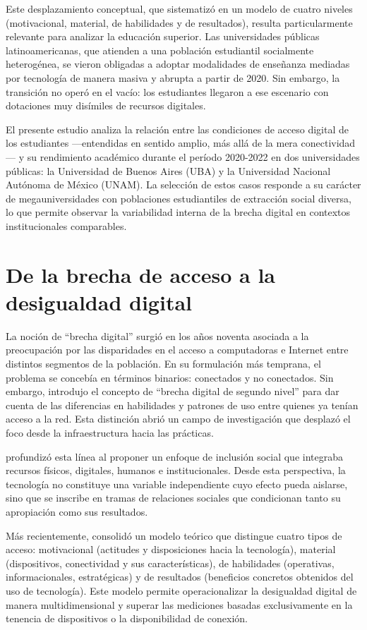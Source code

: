Este desplazamiento conceptual, que \autocite{2563-VANDIJK2020} sistematizó en un modelo de cuatro niveles (motivacional, material, de habilidades y de resultados), resulta particularmente relevante para analizar la educación superior. Las universidades públicas latinoamericanas, que atienden a una población estudiantil socialmente heterogénea, se vieron obligadas a adoptar modalidades de enseñanza mediadas por tecnología de manera masiva y abrupta a partir de 2020. Sin embargo, la transición no operó en el vacío: los estudiantes llegaron a ese escenario con dotaciones muy disímiles de recursos digitales.

El presente estudio analiza la relación entre las condiciones de acceso digital de los estudiantes —entendidas en sentido amplio, más allá de la mera conectividad— y su rendimiento académico durante el período 2020-2022 en dos universidades públicas: la Universidad de Buenos Aires (UBA) y la Universidad Nacional Autónoma de México (UNAM). La selección de estos casos responde a su carácter de megauniversidades con poblaciones estudiantiles de extracción social diversa, lo que permite observar la variabilidad interna de la brecha digital en contextos institucionales comparables.


\section{De la brecha de acceso a la desigualdad digital}
La noción de “brecha digital” surgió en los años noventa asociada a la preocupación por las disparidades en el acceso a computadoras e Internet entre distintos segmentos de la población. En su formulación más temprana, el problema se concebía en términos binarios: conectados y no conectados. Sin embargo, \autocite{2565-HARGITTAI2002} introdujo el concepto de “brecha digital de segundo nivel” para dar cuenta de las diferencias en habilidades y patrones de uso entre quienes ya tenían acceso a la red. Esta distinción abrió un campo de investigación que desplazó el foco desde la infraestructura hacia las prácticas.

\autocite{2562-WARSCHAUER2004} profundizó esta línea al proponer un enfoque de inclusión social que integraba recursos físicos, digitales, humanos e institucionales. Desde esta perspectiva, la tecnología no constituye una variable independiente cuyo efecto pueda aislarse, sino que se inscribe en tramas de relaciones sociales que condicionan tanto su apropiación como sus resultados.

Más recientemente,\autocite{2563-VANDIJK2020} consolidó un modelo teórico que distingue cuatro tipos de acceso: motivacional (actitudes y disposiciones hacia la tecnología), material (dispositivos, conectividad y sus características), de habilidades (operativas, informacionales, estratégicas) y de resultados (beneficios concretos obtenidos del uso de tecnología). Este modelo permite operacionalizar la desigualdad digital de manera multidimensional y superar las mediciones basadas exclusivamente en la tenencia de dispositivos o la disponibilidad de conexión.


